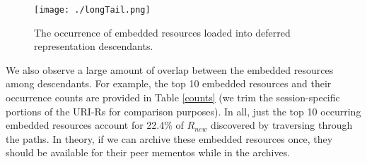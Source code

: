 \documentclass{sig-alternate}
\begin{document}








\begin{figure}
\centering
\texttt{[image: ./longTail.png]}
\caption{The occurrence of embedded resources loaded into deferred representation descendants.}
\label{longtail}
\end{figure}

We also observe a large amount of overlap between the embedded resources among descendants. For example, the top 10 embedded resources and their occurrence counts are provided in Table \ref{counts} (we trim the session-specific portions of the URI-Rs for comparison purposes). In all, just the top 10 occurring embedded resources account for 22.4\% of $R_{new}$ discovered by traversing through the paths. In theory, if we can archive these embedded resources once, they should be available for their peer mementos while in the archives. 
\end{document}
